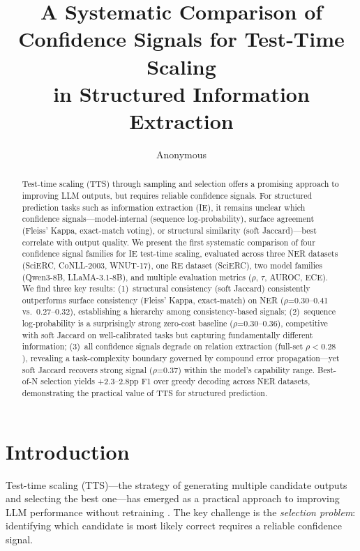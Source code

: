 \documentclass[11pt,a4paper]{article}
\title{A Systematic Comparison of Confidence Signals for Test-Time Scaling\\in Structured Information Extraction}
\author{Anonymous}
\begin{document}
\maketitle

\begin{abstract}
Test-time scaling (TTS) through sampling and selection offers a promising approach to improving LLM outputs, but requires reliable confidence signals.
For structured prediction tasks such as information extraction (IE), it remains unclear which confidence signals---model-internal (sequence log-probability), surface agreement (Fleiss' Kappa, exact-match voting), or structural similarity (soft Jaccard)---best correlate with output quality.
We present the first systematic comparison of four confidence signal families for IE test-time scaling, evaluated across three NER datasets (SciERC, CoNLL-2003, WNUT-17), one RE dataset (SciERC), two model families (Qwen3-8B, LLaMA-3.1-8B), and multiple evaluation metrics ($\rho$, $\tau$, AUROC, ECE).
We find three key results:
(1)~structural consistency (soft Jaccard) consistently outperforms surface consistency (Fleiss' Kappa, exact-match) on NER ($\rho$=0.30--0.41 vs.\ 0.27--0.32), establishing a hierarchy among consistency-based signals;
(2)~sequence log-probability is a surprisingly strong zero-cost baseline ($\rho$=0.30--0.36), competitive with soft Jaccard on well-calibrated tasks but capturing fundamentally different information;
(3)~all confidence signals degrade on relation extraction (full-set $\rho < 0.28$), revealing a task-complexity boundary governed by compound error propagation---yet soft Jaccard recovers strong signal ($\rho$=0.37) within the model's capability range.
Best-of-N selection yields +2.3--2.8pp F1 over greedy decoding across NER datasets, demonstrating the practical value of TTS for structured prediction.
\end{abstract}

\section{Introduction}

Test-time scaling (TTS)---the strategy of generating multiple candidate outputs and selecting the best one---has emerged as a practical approach to improving LLM performance without retraining \cite{wang2023selfconsistency,brown2024large}.
The key challenge is the \emph{selection problem}: identifying which candidate is most likely correct requires a reliable confidence signal.
\end{document}
